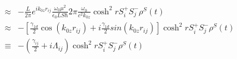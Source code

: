 \documentclass[aps]{article}
\begin{document}
\begin{equation}
\begin{split}
\approx&-\frac{L}{2\pi}e^{ik_{0z}r_{ij}}\frac{\omega_{0}\mu^{2}}{\epsilon_{0}LS\hbar}2\pi\frac{\omega_{0}}{c^{2}k_{0z}}\cosh^{2}rS_{i}^{+}S_{j}^{-}\rho^{S}(t)\\
\approx&-[\frac{\gamma_{1d}}{2}\cos(k_{0z}r_{ij})+i\frac{\gamma_{1d}}{2}sin(k_{0z}r_{ij})]\cosh^{2}rS_{i}^{+}S_{j}^{-}\rho^{S}(t)\\
\equiv&-(\frac{\gamma_{ij}}{2}+i\Lambda_{ij})\cosh^{2}rS_{i}^{+}S_{j}^{-}\rho^{S}(t)
\end{split}
\end{equation}
\end{document}
